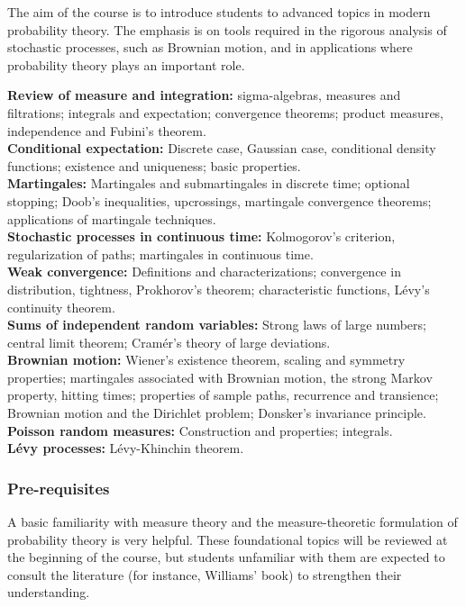\documentclass[a4paper]{article}
\begin{document}
\maketitle
{\small
\setlength{\parindent}{0em}
\setlength{\parskip}{1em}

The aim of the course is to introduce students to advanced topics in modern probability theory. The emphasis is on tools required in the rigorous analysis of stochastic processes, such as Brownian motion, and in applications where probability theory plays an important role.

\noindent\textbf{Review of measure and integration:} sigma-algebras, measures and filtrations; integrals and expectation; convergence theorems; product measures, independence and Fubini's theorem.\\
\noindent\textbf{Conditional expectation:} Discrete case, Gaussian case, conditional density functions; existence and uniqueness; basic properties.\\
\noindent\textbf{Martingales:} Martingales and submartingales in discrete time; optional stopping; Doob's inequalities, upcrossings, martingale convergence theorems; applications of martingale techniques.\\
\noindent\textbf{Stochastic processes in continuous time:} Kolmogorov's criterion, regularization of paths; martingales in continuous time.\\
\noindent\textbf{Weak convergence:} Definitions and characterizations; convergence in distribution, tightness, Prokhorov's theorem; characteristic functions, L\'evy's continuity theorem.\\
\noindent\textbf{Sums of independent random variables:} Strong laws of large numbers; central limit theorem; Cram\'er's theory of large deviations.\\
\noindent\textbf{Brownian motion:} Wiener's existence theorem, scaling and symmetry properties; martingales associated with Brownian motion, the strong Markov property, hitting times; properties of sample paths, recurrence and transience; Brownian motion and the Dirichlet problem; Donsker's invariance principle.\\
\noindent\textbf{Poisson random measures:} Construction and properties; integrals.\\
\noindent\textbf{L\'evy processes:} L\'evy-Khinchin theorem.

\subsubsection*{Pre-requisites}
A basic familiarity with measure theory and the measure-theoretic formulation of probability theory is very helpful. These foundational topics will be reviewed at the beginning of the course, but students unfamiliar with them are expected to consult the literature (for instance, Williams' book) to strengthen their understanding.
}
\tableofcontents
\end{document}
